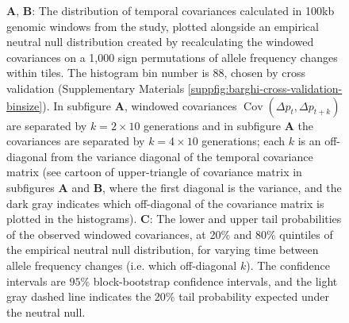 \documentclass[11pt]{article}
\DeclareMathOperator{\cov}{Cov}
\begin{document}
\begin{figure}
  \caption{\footnotesize {\bf A}, {\bf B}: The distribution of temporal covariances
    calculated in 100kb genomic windows from the \textcite{Barghi2019-qy}
    study, plotted alongside an empirical neutral null distribution created by
    recalculating the windowed covariances on a 1,000 sign permutations of
    allele frequency changes within tiles. The histogram bin number is 88,
    chosen by cross validation (Supplementary Materials
    \ref{suppfig:barghi-cross-validation-binsize}). In subfigure {\bf A}, windowed
    covariances $\cov(\Delta p_t, \Delta p_{t+k})$ are separated by $k=2 \times
    10$ generations and in subfigure {\bf A} the covariances are separated by $k=4
    \times 10$ generations; each $k$ is an off-diagonal from the variance
    diagonal of the temporal covariance matrix (see cartoon of upper-triangle
    of covariance matrix in subfigures {\bf A} and {\bf B}, where the first diagonal is the
    variance, and the dark gray indicates which off-diagonal of the covariance
    matrix is plotted in the histograms). {\bf C}: The lower and upper tail
    probabilities of the observed windowed covariances, at 20\% and 80\%
    quintiles of the empirical neutral null distribution, for varying time
    between allele frequency changes (i.e. which off-diagonal $k$). The
  confidence intervals are  $95\%$ block-bootstrap confidence intervals, and the
light gray dashed line indicates the 20\% tail probability expected under the
neutral null.}
    \label{fig:figure-3} 
\end{figure}
\end{document}
